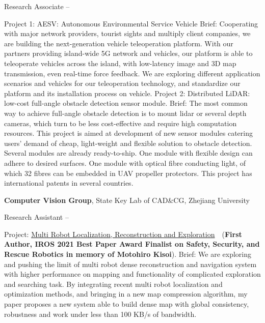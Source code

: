 \documentclass[letterpaper,MMMyyyy,nonstopmode]{simpleresumecv}
\begin{document}
\begin{Body}
\BulletItem
Research Associate
\hfill
{} --
\begin{Detail}
\SubBulletItem
Project 1:
AESV: Autonomous Environmental Service Vehicle
\SubBulletItem
Brief:
Cooperating with major network providers, tourist sights and multiply client companies, we are building the next-generation vehicle teleoperation platform.
With our partners providing island-wide 5G network and vehicles, our platform is able to teleoperate vehicles across the island, with low-latency image and 3D map transmission, even real-time force feedback.
We are exploring different application scenarios and vehicles for our teleoperation technology, and standardize our platform and its installation process on vehicle.
\SubBulletItem 
Project 2:
Distributed LiDAR: low-cost full-angle obstacle detection sensor module.
\SubBulletItem
Brief:
The most common way to achieve full-angle obstacle detection is to mount lidar or several depth cameras, which turn to be less cost-effective and require high computation resources.
This project is aimed at development of new sensor modules catering users' demand of cheap, light-weight and flexible solution to obstacle detection.
Several modules are already ready-to-ship.
One module with flexible design can adhere to desired surfaces.
One module with optical fibre conducting light, of which 32 fibres can be embedded in UAV propeller protectors.
This project has international patents in several countries.
\end{Detail}

\Entry
{\textbf{Computer Vision Group}},
State Key Lab of CAD\&CG, Zhejiang University

\BulletItem
Research Assistant
\hfill
{} --
\begin{Detail}
\SubBulletItem
Project:
\href{https://ieeexplore.ieee.org/document/9636645}{\color{blue}Multi Robot Localization, Reconstruction and Exploration}~\cite{xiangyu2021coxgraph}~(\textbf{First Author, IROS 2021 Best Paper Award Finalist on Safety, Security, and Rescue Robotics in memory of Motohiro Kisoi}).
\SubBulletItem
Brief:
We are exploring and pushing the limit of multi robot dense reconstruction and navigation system with higher performance on mapping and functionality of complicated exploration and searching task.
By integrating recent multi robot localization and optimization methods, and bringing in a new map compression algorithm, my paper proposes a new system able to build dense map with global consistency, robustness and work under less than 100 KB/s of bandwidth.


\end{Detail}
\end{Body}
\end{document}
